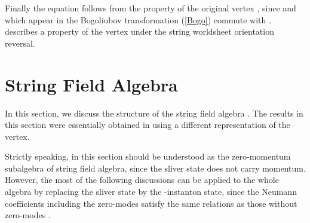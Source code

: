 \documentclass[a4paper,12pt]{article}
\begin{document}
Finally the equation \coordHE{}
follows from the property of the
original vertex \coordHE{},
since \coordHE{} and \coordHE{} which appear in the 
Bogoliubov transformation (\ref{Bogo})
commute with \coordHE{}.
\coordHE{} describes a property of the vertex under
the string worldsheet orientation reversal.


\section{String Field Algebra}
In this section, we discuss the structure of the string field algebra 
\coordHE{}. 
The results in this section were essentially obtained in
\cite{KawanoOkuyama} 
using a different representation of the vertex. 

Strictly speaking, \coordHE{} in this section
should be understood as the zero-momentum subalgebra of string field algebra,
since the sliver state does not carry momentum. 
However, the most of the following discussions can be applied to the
whole algebra by replacing the sliver state by the \coordHE{}-instanton state,
since the Neumann coefficients including the zero-modes satisfy the same
relations as those without zero-modes
\cite{KosteleckyPotting,RSZ1,GrossTaylor}. 
\end{document}
